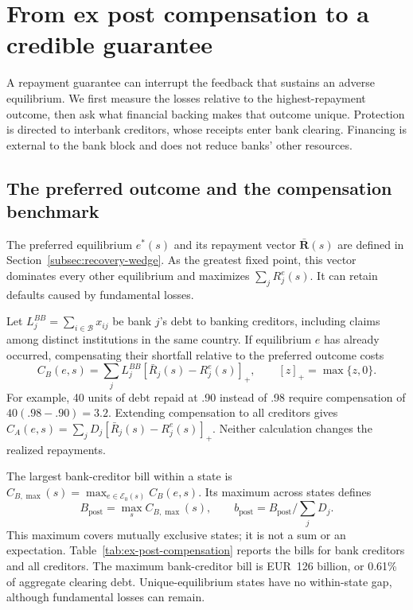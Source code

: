 \section{From ex post compensation to a credible guarantee}
\label{sec:ex-post-compensation}

A repayment guarantee can interrupt the feedback that sustains an adverse equilibrium. We first measure the losses relative to the highest-repayment outcome, then ask what financial backing makes that outcome unique. Protection is directed to interbank creditors, whose receipts enter bank clearing. Financing is external to the bank block and does not reduce banks' other resources.

\subsection{The preferred outcome and the compensation benchmark}

The preferred equilibrium $e^*(s)$ and its repayment vector $\bar{\mathbf{R}}(s)$ are defined in Section~\ref{subsec:recovery-wedge}. As the greatest fixed point, this vector dominates every other equilibrium and maximizes $\sum_jR_j^e(s)$. It can retain defaults caused by fundamental losses.

Let $L_j^{BB}=\sum_{i\in\mathcal B}x_{ij}$ be bank $j$'s debt to banking creditors, including claims among distinct institutions in the same country. If equilibrium $e$ has already occurred, compensating their shortfall relative to the preferred outcome costs
\[
 C_B(e,s)=\sum_jL_j^{BB}[\bar R_j(s)-R_j^e(s)]_+,
 \qquad [z]_+=\max\{z,0\}.
\]
For example, 40 units of debt repaid at .90 instead of .98 require compensation of $40(.98-.90)=3.2$. Extending compensation to all creditors gives $C_A(e,s)=\sum_jD_j[\bar R_j(s)-R_j^e(s)]_+$. Neither calculation changes the realized repayments.

The largest bank-creditor bill within a state is $C_{B,\max}(s)=\max_{e\in\mathcal E_0(s)}C_B(e,s)$. Its maximum across states defines
\begin{equation}
 B_{\mathrm{post}}=\max_s C_{B,\max}(s),\qquad
 b_{\mathrm{post}}=B_{\mathrm{post}}/\sum_jD_j.
 \label{eq:ex-post-compensation-bound}
\end{equation}
This maximum covers mutually exclusive states; it is not a sum or an expectation. Table~\ref{tab:ex-post-compensation} reports the bills for bank creditors and all creditors. The maximum bank-creditor bill is EUR~126 billion, or 0.61\% of aggregate clearing debt. Unique-equilibrium states have no within-state gap, although fundamental losses can remain.

